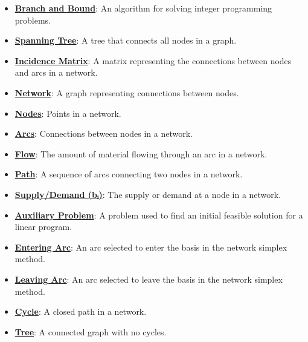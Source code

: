 \documentclass{article}%
\begin{document}
\begin{itemize}[leftmargin=*]
\item \href{https://www.math.purdue.edu/~yipn/421/2024-12-03-Duality.pdf#page=1}{\textbf{Branch and Bound}}: An algorithm for solving integer programming problems. %
\item \href{https://www.math.purdue.edu/~yipn/421/2024-12-03-Duality.pdf#page=1}{\textbf{Spanning Tree}}: A tree that connects all nodes in a graph. %
\item \href{https://www.math.purdue.edu/~yipn/421/2024-12-03-Duality.pdf#page=1}{\textbf{Incidence Matrix}}: A matrix representing the connections between nodes and arcs in a network. %
\item \href{https://www.math.purdue.edu/~yipn/421/2024-12-03-Duality.pdf#page=1}{\textbf{Network}}: A graph representing connections between nodes. %
\item \href{https://www.math.purdue.edu/~yipn/421/2024-12-03-Duality.pdf#page=1}{\textbf{Nodes}}: Points in a network. %
\item \href{https://www.math.purdue.edu/~yipn/421/2024-12-03-Duality.pdf#page=1}{\textbf{Arcs}}: Connections between nodes in a network. %
\item \href{https://www.math.purdue.edu/~yipn/421/2024-12-03-Duality.pdf#page=1}{\textbf{Flow}}: The amount of material flowing through an arc in a network. %
\item \href{https://www.math.purdue.edu/~yipn/421/2024-12-03-Duality.pdf#page=1}{\textbf{Path}}: A sequence of arcs connecting two nodes in a network. %
\item \href{https://www.math.purdue.edu/~yipn/421/2024-12-03-Duality.pdf#page=1}{\textbf{Supply/Demand (bᵢ)}}: The supply or demand at a node in a network. %
\item \href{https://www.math.purdue.edu/~yipn/421/2024-12-03-Duality.pdf#page=1}{\textbf{Auxiliary Problem}}: A problem used to find an initial feasible solution for a linear program. %
\item \href{https://www.math.purdue.edu/~yipn/421/2024-12-03-Duality.pdf#page=1}{\textbf{Entering Arc}}: An arc selected to enter the basis in the network simplex method. %
\item \href{https://www.math.purdue.edu/~yipn/421/2024-12-03-Duality.pdf#page=1}{\textbf{Leaving Arc}}: An arc selected to leave the basis in the network simplex method. %
\item \href{https://www.math.purdue.edu/~yipn/421/2024-12-03-Duality.pdf#page=1}{\textbf{Cycle}}: A closed path in a network. %
\item \href{https://www.math.purdue.edu/~yipn/421/2024-12-03-Duality.pdf#page=1}{\textbf{Tree}}: A connected graph with no cycles. %

\end{itemize}
\end{document}
